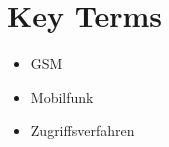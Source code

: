 \chapter*{Key Terms}
\vspace{0.65cm}

\begin{itemize}
	\setlength{\itemsep}{0pt}
	\item[] GSM
	\item[] Mobilfunk
	\item[] Zugriffsverfahren
\end{itemize}
